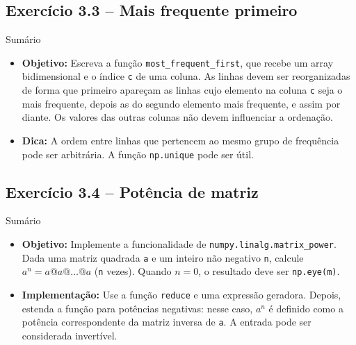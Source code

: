 \documentclass[11pt,a4paper]{article}
\begin{document}
\subsection*{Exercício 3.3 -- Mais frequente primeiro}
\begin{exercicio}{Sumário}
\begin{itemize}
    \item \textbf{Objetivo:} Escreva a função \texttt{most\_frequent\_first}, que recebe um array bidimensional e o índice \texttt{c} de uma coluna. As linhas devem ser reorganizadas de forma que primeiro apareçam as linhas cujo elemento na coluna \texttt{c} seja o mais frequente, depois as do segundo elemento mais frequente, e assim por diante. Os valores das outras colunas não devem influenciar a ordenação.
    \item \textbf{Dica:} A ordem entre linhas que pertencem ao mesmo grupo de frequência pode ser arbitrária. A função \texttt{np.unique} pode ser útil.
\end{itemize}
\end{exercicio}

\subsection*{Exercício 3.4 -- Potência de matriz}
\begin{exercicio}{Sumário}
\begin{itemize}
    \item \textbf{Objetivo:} Implemente a funcionalidade de \texttt{numpy.linalg.matrix\_power}. Dada uma matriz quadrada \texttt{a} e um inteiro não negativo \texttt{n}, calcule $a^n = a @ a @ \dots @ a$ (\texttt{n} vezes). Quando $n=0$, o resultado deve ser \texttt{np.eye(m)}.
    \item \textbf{Implementação:} Use a função \texttt{reduce} e uma expressão geradora. Depois, estenda a função para potências negativas: nesse caso, $a^n$ é definido como a potência correspondente da matriz inversa de \texttt{a}. A entrada pode ser considerada invertível.
\end{itemize}
\end{exercicio}
\end{document}
